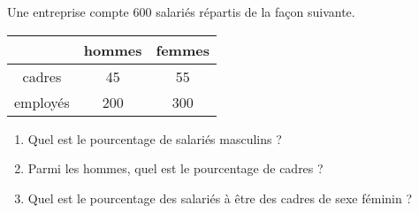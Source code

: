 
\begin{exercice}\label{exoPremiere-0015}

    Une entreprise compte \( 600\) salariés répartis de la façon suivante.

    \begin{center}
        \begin{tabular}{|c|c|c|}
            \hline
            &hommes&femmes\\
            \hline
            cadres&45&55\\
            \hline
            employés&200&300\\
            \hline
        \end{tabular}
    \end{center}

    \begin{enumerate}
        \item
            Quel est le pourcentage de salariés masculins ?
        \item
            Parmi les hommes, quel est le pourcentage de cadres ?
        \item
            Quel est le pourcentage des salariés à être des cadres de sexe féminin ?
    \end{enumerate}

\end{exercice}
